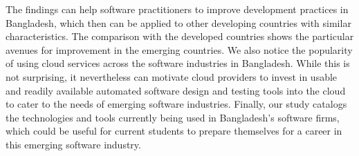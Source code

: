 

The findings can help software practitioners to
improve development practices in Bangladesh, which then can be applied to other developing countries with similar 
characteristics. The comparison with the developed countries shows the particular avenues for improvement in the emerging countries. 
We also notice the popularity of using cloud services across the software industries in Bangladesh. 
While this is not surprising, it nevertheless can motivate cloud providers to invest in usable and 
readily available automated software design and testing tools into the cloud to cater to the needs of 
emerging software industries. Finally, our study catalogs the
technologies and tools currently being used in Bangladesh's software firms, which could be 
useful for current students to prepare themselves for a career in this emerging software industry.

% 


